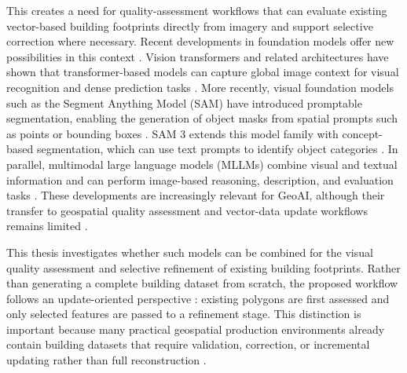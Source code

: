 This creates a need for quality-assessment workflows that can evaluate existing vector-based building footprints directly from imagery and support selective correction where necessary. Recent developments in foundation models offer new possibilities in this context \citep{awais2023foundationalmodelsdefiningnew}. Vision transformers and related architectures have shown that transformer-based models can capture global image context for visual recognition and dense prediction tasks \citep{DosovitskiyTransformer, ranftl2021visiontransformersdenseprediction}. More recently, visual foundation models such as the Segment Anything Model (SAM) have introduced promptable segmentation, enabling the generation of object masks from spatial prompts such as points or bounding boxes \citep{kirillov2023segment}. SAM 3 extends this model family with concept-based segmentation, which can use text prompts to identify object categories \citep{papersam3}. In parallel, multimodal large language models (MLLMs) combine visual and textual information and can perform image-based reasoning, description, and evaluation tasks \citep{wu2023multimodallargelanguagemodels, Yin_2024MLLM}. These developments are increasingly relevant for GeoAI, although their transfer to geospatial quality assessment and vector-data update workflows remains limited \citep{mai2023opportunitieschallengesfoundationmodels, Ji_2025_foundationGeospatiolreasoning}.

This thesis investigates whether such models can be combined for the visual quality assessment and selective refinement of existing building footprints. Rather than generating a complete building dataset from scratch, the proposed workflow follows an update-oriented perspective \citep{Qin_changedetection, Wadembere_GeometryAdjustment}: existing polygons are first assessed and only selected features are passed to a refinement stage. This distinction is important because many practical geospatial production environments already contain building datasets that require validation, correction, or incremental updating rather than full reconstruction \citep{Wadembere_GeometryAdjustment}.

